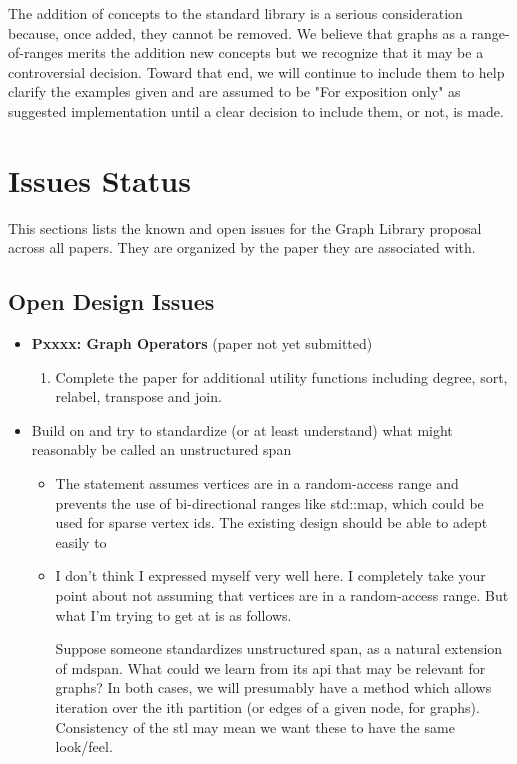 The addition of concepts to the standard library is a serious consideration because, once added, they cannot 
be removed. We believe that graphs as a range-of-ranges merits the addition new concepts but we recognize that it
may be a controversial decision. Toward that end, we will continue to include them to help clarify the examples given
and are assumed to be "For exposition only" as suggested implementation until a clear decision to include them, or not, 
is made.

\section{Issues Status}
This sections lists the known and open issues for the Graph Library proposal across all papers. They are organized
by the paper they are associated with.

\subsection{Open Design Issues}
\begin{itemize}
      \item \textbf{Pxxxx: Graph Operators} (paper not yet submitted)
            \begin{enumerate}
                  \item Complete the paper for additional utility functions including degree, sort, relabel, transpose and join.
            \end{enumerate}
      \item Build on  and try to standardize (or at least understand) what might reasonably be called an unstructured span
            \begin{itemize}
                  \item The statement assumes vertices are in a random-access range and prevents the use of bi-directional ranges like std::map, which 
                        could be used for sparse vertex ids. The existing design should be able to adept easily to 
                  \item I don't think I expressed myself very well here. I completely take your point about not assuming that vertices are in a random-access range. 
                        But what I'm trying to get at is as follows. 
                        
                        Suppose someone standardizes unstructured span, as a natural extension of mdspan. What could we 
                        learn from its api that may be relevant for graphs? In both cases, we will presumably have a method which allows iteration over the ith partition 
                        (or edges of a given node, for graphs). Consistency of the stl may mean we want these to have the same look/feel.
            \end{itemize}
\end{itemize}

